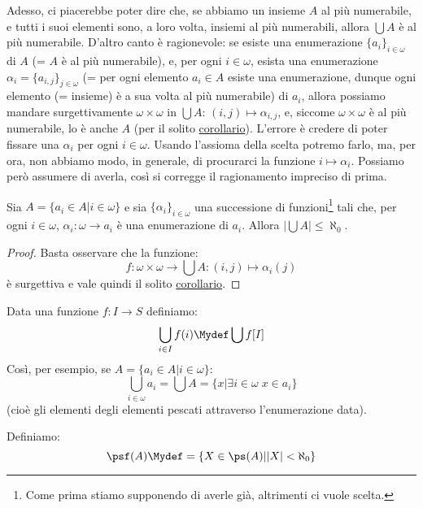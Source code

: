 \documentclass[11pt]{scrartcl}
\begin{document}
Adesso, ci piacerebbe poter dire che, se abbiamo un insieme $A$ al più numerabile, e tutti i suoi elementi sono, a loro volta, insiemi al più numerabili, allora
$\bigcup A$ è al più numerabile. D'altro canto è ragionevole: se esiste una enumerazione $\{a_i\}_{i \in \omega}$ di $A$ (= $A$ è al più numerabile), e, per ogni $i \in \omega$, esista una enumerazione $\alpha_i = \{a_{i,j}\}_{j \in \omega}$ (= per ogni elemento $a_i \in A$ esiste 
una enumerazione, dunque ogni elemento (= insieme) è a sua volta al più numerabile)
di $a_i$, allora possiamo mandare surgettivamente $\omega \times \omega$ in $\bigcup A$: $(i,j) \mapsto \alpha_{i,j}$, e, siccome $\omega \times \omega$ è al più numerabile, lo è anche $A$ (per il solito \hyperref[disugcardnum]{corollario}).
L'errore è credere di poter fissare una $\alpha_i$ per ogni $i \in \omega$. Usando l'assioma della scelta potremo farlo, ma, per ora, non abbiamo modo, in generale, di procurarci la funzione $i \mapsto \alpha_i$. Possiamo però 
assumere di averla, così si corregge il ragionamento impreciso di prima.

\begin{proposition}
	Sia $A = \{a_i \in A| i \in \omega\}$ e sia $\{\alpha_i\}_{i \in \omega}$ una successione di funzioni\footnote{Come prima stiamo supponendo di averle già, altrimenti ci vuole scelta.} tali che, per ogni $i \in \omega$, $\alpha_i : \omega \rightarrow a_i$ è 
	una enumerazione di $a_i$. Allora $|\bigcup A| \leq \aleph_0$.
\end{proposition}

\begin{proof}
	Basta osservare che la funzione:
	\[ f : \omega \times \omega \longrightarrow \bigcup A : (i,j) \longmapsto \alpha_i(j)
		\]
	è surgettiva e vale quindi il solito \hyperref[disugcardnum]{corollario}.
\end{proof}

\begin{notation}
	Data una funzione $f : I \rightarrow S$ definiamo:
	\[ \bigcup_{i \in I} f(i) \Mydef \bigcup f[I]
		\]
	Così, per esempio, se $A = \{a_i \in A | i \in \omega\}$:
	\[ \bigcup_{i \in \omega} a_i = \bigcup A = \{x | \exists i \in \omega \; x \in a_i\}
		\]
	(cioè gli elementi degli elementi pescati attraverso l'enumerazione data).
\end{notation}

\begin{definition}
	Definiamo:
	\[ \psf(A) \Mydef = \{X \in \ps(A) | |X| < \aleph_0\}
		\]
\end{definition}
\end{document}
